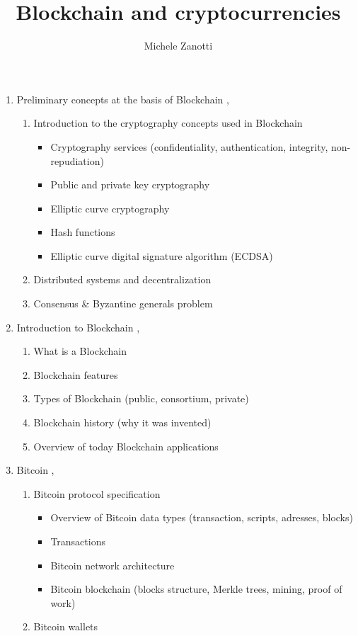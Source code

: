 \documentclass[12pt, a4paper]{article}
\title{Blockchain and cryptocurrencies}
\date{}
\author{Michele Zanotti}
\begin{document}
  \maketitle
  \tableofcontents

  \begin{enumerate}
    \item Preliminary concepts at the basis of Blockchain \cite{bambara2018blockchain},\cite{bashir2017mastering}
    \begin{enumerate}
      \item Introduction to the cryptography concepts used in Blockchain \cite{bashir2017mastering}
      \begin{itemize}
        \item Cryptography services (confidentiality, authentication, integrity, non-repudiation)
        \item Public and private key cryptography
        \item Elliptic curve cryptography
        \item Hash functions
        \item Elliptic curve digital signature algorithm (ECDSA)
      \end{itemize}
      \item Distributed systems and decentralization
      \item Consensus \& Byzantine generals problem
    \end{enumerate}

    \item Introduction to Blockchain \cite{bambara2018blockchain},\cite{bashir2017mastering}
    \begin{enumerate}
      \item What is a Blockchain
      \item Blockchain features
      \item Types of Blockchain (public, consortium, private)
      \item Blockchain history (why it was invented)
      \item Overview of today Blockchain applications
    \end{enumerate}

    \item Bitcoin \cite{karame2016bitcoin},\cite{antonopoulos2017mastering}
    \begin{enumerate}
      \item Bitcoin protocol specification
      \begin{itemize}
        \item Overview of Bitcoin data types (transaction, scripts, adresses, blocks)
        \item Transactions
        \item Bitcoin network architecture
        \item Bitcoin blockchain (blocks structure, Merkle trees, mining, proof of
        work)
      \end{itemize}
      \item Bitcoin wallets
    \end{enumerate}


\end{enumerate}
\end{document}

